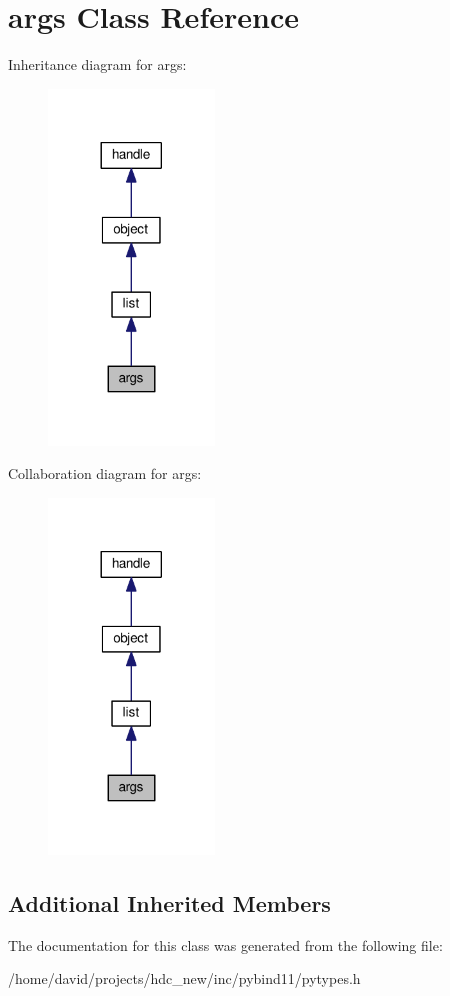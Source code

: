 \hypertarget{classargs}{}\section{args Class Reference}
\label{classargs}


Inheritance diagram for args\+:
\nopagebreak
\begin{figure}[H]
\begin{center}
\leavevmode
\includegraphics[width=125pt]{classargs__inherit__graph}
\end{center}
\end{figure}


Collaboration diagram for args\+:
\nopagebreak
\begin{figure}[H]
\begin{center}
\leavevmode
\includegraphics[width=125pt]{classargs__coll__graph}
\end{center}
\end{figure}
\subsection*{Additional Inherited Members}


The documentation for this class was generated from the following file\+:\begin{DoxyCompactItemize}
\item 
/home/david/projects/hdc\+\_\+new/inc/pybind11/pytypes.\+h\end{DoxyCompactItemize}
